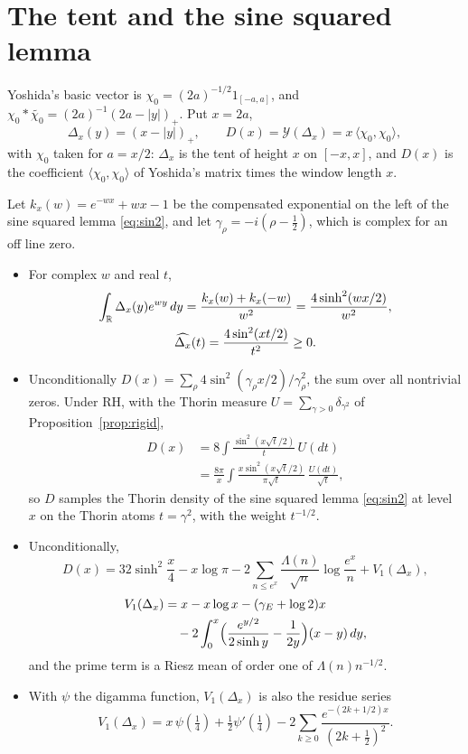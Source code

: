 \section{The tent and the sine squared lemma}\label{yo:sec:tent}

Yoshida's basic vector is $\chi_0=(2a)^{-1/2}1_{[-a,a]}$, and $\chi_0*\widetilde{\chi_0}=(2a)^{-1}(2a-|y|)_+$. Put $x=2a$,
\[
\Delta_x(y)=(x-|y|)_+,\qquad D(x)=\mathcal Y(\Delta_x)=x\,\langle\chi_0,\chi_0\rangle,
\]
with $\chi_0$ taken for $a=x/2$: $\Delta_x$ is the tent of height $x$ on $[-x,x]$, and $D(x)$ is the coefficient $\langle\chi_0,\chi_0\rangle$ of Yoshida's matrix times the window length $x$.

\begin{proposition}\label{yo:prop:tent}
Let $k_x(w)=e^{-wx}+wx-1$ be the compensated exponential on the left of the sine squared lemma \eqref{eq:sin2}, and let $\gamma_\rho=-i(\rho-\frac12)$, which is complex for an off line zero.
\begin{itemize}
\item[(a)] For complex $w$ and real $t$,
\[
\begin{gathered}
\int_{\mathbb{R}}\Delta_x(y)e^{wy}\,dy=\frac{k_x(w)+k_x(-w)}{w^2}=\frac{4\sinh^2(wx/2)}{w^2},\\
\widehat{\Delta_x}(t)=\frac{4\sin^2(xt/2)}{t^2}\ge0 .
\end{gathered}
\]
\item[(b)] Unconditionally $D(x)=\sum_\rho4\sin^2(\gamma_\rho x/2)/\gamma_\rho^2$, the sum over all nontrivial zeros. Under RH, with the Thorin measure $U=\sum_{\gamma>0}\delta_{\gamma^2}$ of Proposition~\ref{prop:rigid},
\[
\begin{aligned}
D(x)&=8\int\frac{\sin^2(x\sqrt t/2)}{t}\,U(dt)\\
&=\frac{8\pi}x\int\frac{x\sin^2(x\sqrt t/2)}{\pi\sqrt t}\,\frac{U(dt)}{\sqrt t},
\end{aligned}
\]
so $D$ samples the Thorin density of the sine squared lemma \eqref{eq:sin2} at level $x$ on the Thorin atoms $t=\gamma^2$, with the weight $t^{-1/2}$.
\item[(c)] Unconditionally,
\[
D(x)=32\sinh^2\frac x4-x\log\pi-2\sum_{n\le e^x}\frac{\Lambda(n)}{\sqrt n}\log\frac{e^x}{n}+V_1(\Delta_x),
\]
\[
\begin{aligned}
V_1(\Delta_x)&=x-x\log x-(\gamma_E+\log2)x\\
&\quad-2\int_0^x\Bigl(\frac{e^{y/2}}{2\sinh y}-\frac1{2y}\Bigr)(x-y)\,dy,
\end{aligned}
\]
and the prime term is a Riesz mean of order one of $\Lambda(n)n^{-1/2}$.
\item[(d)] With $\psi$ the digamma function, $V_1(\Delta_x)$ is also the residue series
\[
V_1(\Delta_x)=x\,\psi(\tfrac14)+\tfrac12\psi'(\tfrac14)-2\sum_{k\ge0}\frac{e^{-(2k+1/2)x}}{(2k+\frac12)^2}.
\]
\end{itemize}
\end{proposition}

